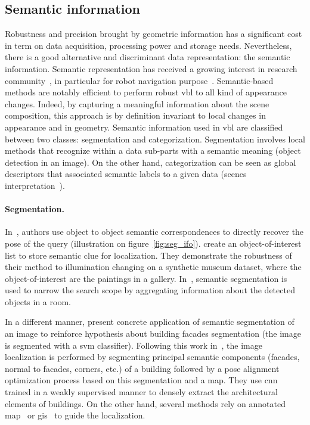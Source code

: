 	\subsection{Semantic information}
		\label{subsec:semantic_info}
		Robustness and precision brought by geometric information has a significant cost in term on data acquisition, processing power and storage needs. Nevertheless, there is a good alternative and discriminant data representation: the semantic information. Semantic representation has received a growing interest in research community~\citep{Liu2016a}, in particular for robot navigation purpose~\citep{Kostavelis2015}. Semantic-based methods are notably efficient to perform robust \ac{vbl} to all kind of appearance changes. Indeed, by capturing a meaningful information about the scene composition, this approach is by definition invariant to local changes in appearance and in geometry. Semantic information used in \ac{vbl} are classified between two classes: segmentation and categorization. Segmentation involves local methods that recognize within a data sub-parts with a semantic meaning (\eg object detection in an image). On the other hand, categorization can be seen as global descriptors that associated semantic labels to a given data (\eg scenes interpretation~\citep{Deng2009}).
		
		\paragraph{Segmentation.}
			 In~\citep{Ardeshir2014,Castaldo2015,Christie2016,Weinzaepfel2019}, authors use object to object semantic correspondences to directly recover the pose of the query (illustration on figure~\ref{fig:seg_ifo}). \citet{Weinzaepfel2019} create an object-of-interest list to store semantic clue for localization. They demonstrate the robustness of their method to illumination changing on a synthetic museum dataset, where the object-of-interest are the paintings in a gallery. In~\citep{Lu2015}, semantic segmentation is used to narrow the search scope by aggregating information about the detected objects in a room.

 			 In a different manner, \citet{Arth2015} present concrete application of semantic segmentation of an image to reinforce hypothesis about building facades segmentation (the image is segmented with a \ac{svm} classifier). Following this work in~\citep{Armagan2017a,Armagan2017b,Armagan2017}, the image localization is performed by segmenting principal semantic components (facades, normal to facades, corners, etc.) of a building followed by a pose alignment optimization process based on this segmentation and a map. They use \ac{cnn} trained in a weakly supervised manner to densely extract the architectural elements of buildings. On the other hand, several methods rely on annotated map~\citep{Atanasov2016,Wang2015} or \ac{gis}~\citep{Ardeshir2014,Castaldo2015,Qu2015} to guide the localization.
 			
